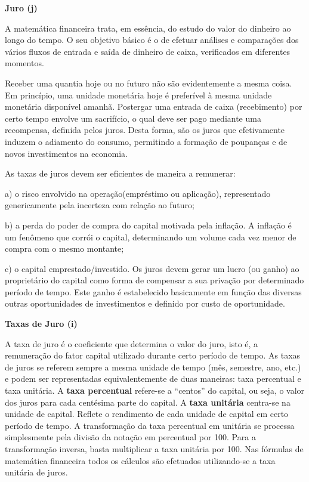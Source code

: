 \textbf{Juro (j)}

	A matemática financeira trata, em essência, do estudo do valor do dinheiro ao longo do tempo. O seu objetivo básico é o de efetuar análises e comparações dos vários fluxos de entrada e saída de dinheiro de caixa, verificados em diferentes momentos.	
	
	Receber uma quantia hoje ou no futuro não são evidentemente a mesma coisa. Em princípio, uma unidade monetária hoje é preferível à mesma unidade monetária disponível amanhã. Postergar uma entrada de caixa (recebimento) por certo tempo envolve um sacrifício, o qual deve ser pago mediante uma recompensa, definida pelos juros. Desta forma, são os juros que efetivamente induzem o adiamento do consumo, permitindo a formação de poupanças e de novos investimentos na economia.
	
	As taxas de juros devem ser eficientes de maneira a remunerar:

    a) o risco envolvido na operação(empréstimo ou aplicação), representado genericamente pela incerteza com relação ao futuro;
	
	b) a perda do poder de compra do capital motivada pela inflação. A inflação é um fenômeno que corrói o capital, determinando um volume cada vez menor de compra com o mesmo montante;
	
	c) o capital emprestado/investido. Os juros devem gerar um lucro (ou ganho) ao proprietário do capital como forma de  compensar a sua privação por determinado período de tempo. Este ganho é estabelecido basicamente em função das diversas outras oportunidades de investimentos e definido por custo de oportunidade.

	\textbf{Taxas de Juro (i)}

	A taxa de juro é o coeficiente que determina o valor do juro, isto é, a remuneração do fator capital utilizado durante certo período de tempo.
	As taxas de juros se referem sempre a mesma unidade de tempo (mês, semestre, ano, etc.) e podem ser representadas equivalentemente de duas maneiras: taxa percentual e taxa unitária.
	A \textbf{taxa percentual} refere-se a “centos” do capital, ou seja, o valor dos juros para cada centésima parte do capital.
	A \textbf{taxa unitária} centra-se na unidade de capital. Reflete o rendimento de cada unidade de capital em certo período de tempo.
	A transformação da taxa percentual em unitária se processa simplesmente pela divisão da notação em percentual por 100. Para a transformação inversa, basta multiplicar a taxa unitária por 100. Nas fórmulas de matemática financeira todos os cálculos são efetuados utilizando-se a taxa unitária de juros.


